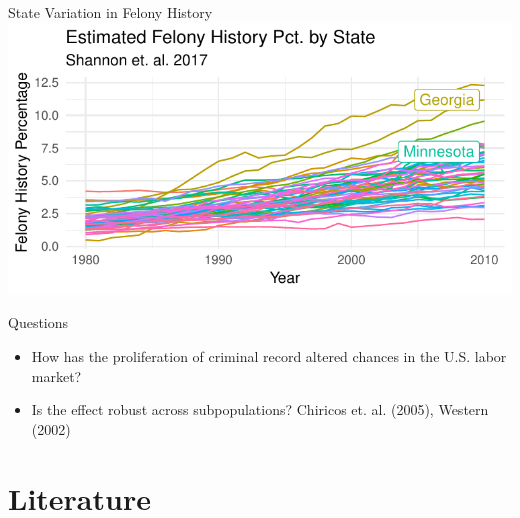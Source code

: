 \documentclass{beamer}\usepackage[]{graphicx}\usepackage[]{color}
\makeatletter
\def\maxwidth{ %
  \ifdim\Gin@nat@width>\linewidth
    \linewidth
  \else
    \Gin@nat@width
  \fi
}
\newenvironment{knitrout}{}{} %
\makeatother
\begin{document}
\begin{frame}{State Variation in Felony History}
\begin{knitrout}
\color{fgcolor}
\includegraphics[width=\maxwidth]{figure/unnamed-chunk-7-1} 

\end{knitrout}
\end{frame}

\begin{frame}{Questions}
\begin{block}{}
\begin{itemize}

\item How has the proliferation of criminal record altered chances in the U.S. labor market?

\item Is the effect robust across subpopulations? Chiricos et. al. (2005), Western (2002)

\end{itemize}
\end{block}
\end{frame}

\section{Literature}
\end{document}
